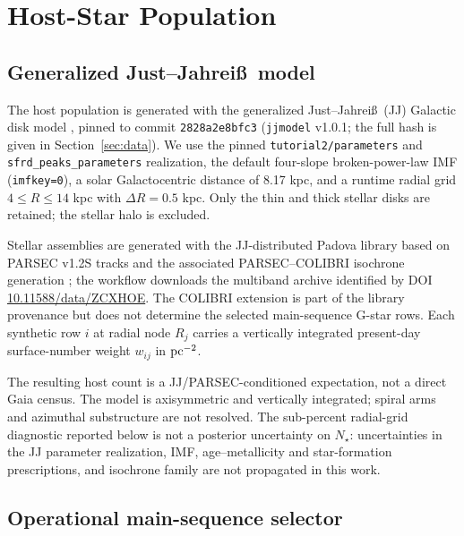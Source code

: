 \section{Host-Star Population}\label{sec:hosts}

\subsection{Generalized Just--Jahrei\ss\ model}

The host population is generated with the generalized Just--Jahrei\ss\ (JJ) Galactic disk model \citep{JustJahreiss2010,Sysoliatina2022}, pinned to commit \texttt{2828a2e8bfc3} (\texttt{jjmodel} v1.0.1; the full hash is given in Section~\ref{sec:data}). We use the pinned \texttt{tutorial2/parameters} and \texttt{sfrd\_peaks\_parameters} realization, the default four-slope broken-power-law IMF (\texttt{imfkey=0}), a solar Galactocentric distance of 8.17 kpc, and a runtime radial grid $4\leq R\leq14$ kpc with $\Delta R=0.5$ kpc. Only the thin and thick stellar disks are retained; the stellar halo is excluded.

Stellar assemblies are generated with the JJ-distributed Padova library based on PARSEC v1.2S tracks \citep{Bressan2012} and the associated PARSEC--COLIBRI isochrone generation \citep{Marigo2017}; the workflow downloads the multiband archive identified by DOI \href{https://doi.org/10.11588/data/ZCXHOE}{10.11588/data/ZCXHOE}. The COLIBRI extension is part of the library provenance but does not determine the selected main-sequence G-star rows. Each synthetic row $i$ at radial node $R_j$ carries a vertically integrated present-day surface-number weight $w_{ij}$ in ${\rm pc}^{-2}$.

The resulting host count is a JJ/PARSEC-conditioned expectation, not a direct Gaia census. The model is axisymmetric and vertically integrated; spiral arms and azimuthal substructure are not resolved. The sub-percent radial-grid diagnostic reported below is not a posterior uncertainty on $N_\star$: uncertainties in the JJ parameter realization, IMF, age--metallicity and star-formation prescriptions, and isochrone family are not propagated in this work.

\subsection{Operational main-sequence selector}\label{subsec:selector}

